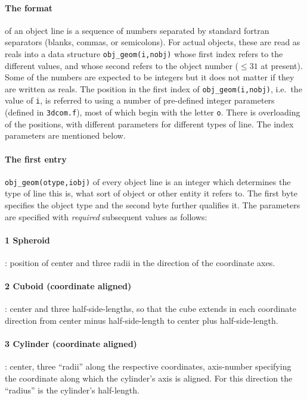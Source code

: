 \documentclass[12pt]{article}
\begin{document}
\paragraph{The format} of an object line is a sequence of numbers
separated by standard fortran separators (blanks, commas, or
semicolons). For actual objects, these are read as reals into a data
structure \verb!obj_geom(i,nobj)! whose first index refers to the
different values, and whose second refers to the object number
($\le31$ at present).  Some of the numbers are expected to be integers
but it does not matter if they are written as reals. The position in
the first index of \verb!obj_geom(i,nobj)!, i.e.\ the value of
\verb!i!, is referred to using a number of pre-defined integer
parameters (defined in \verb!3dcom.f!), most of which begin with the
letter \verb!o!. There is overloading of the positions, with different
parameters for different types of line. The index parameters are
mentioned below.

\paragraph{The first entry} 
\verb!obj_geom(otype,iobj)! of every object line is an integer which
determines the type of line this is, what sort of object or other
entity it refers to. The first byte specifies the object type and the
second byte further qualifies it. The parameters are specified with
\emph{required} subsequent values as follows:

\paragraph{1 Spheroid}: position of center and three radii in the
direction of the coordinate axes.

\paragraph{2 Cuboid (coordinate aligned)}: center and three
half-side-lengths, so that the cube extends in each coordinate
direction from center minus half-side-length to center plus
half-side-length.

\paragraph{3 Cylinder (coordinate aligned)}: center, three ``radii''
along the respective coordinates, axis-number specifying the
coordinate along which the cylinder's axis is aligned. For this
direction the ``radius'' is the cylinder's half-length.
\end{document}
